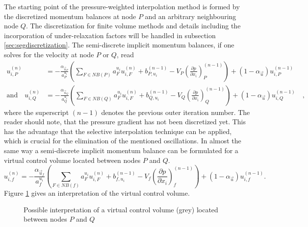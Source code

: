 The starting point of the pressure-weighted interpolation method is formed by the discretized momentum balances at node \(P\) and an arbitrary neighbouring node \(Q\). The discretization for finite volume methods and details including the incorporation of under-relaxation factors will be handled in subsection \ref{sec:segdiscretization}. The semi-discrete implicit momentum balances, if one solves for the velocity at node \(P\) or \(Q\), read
\begin{subequations}
\begin{align}
    u_{i,P}^{(n)} 
    &= 
    - \frac{\alpha_{\vec{u}_P}}{a_P^{u_i}} \left(\sum_{F \in NB(P)} a_F^{u_i} u_{i,F}^{(n)}
    +                                     b_{P,u_i}^{(n-1)} 
    -                                     V_P\left(\frac{\partial p}{\partial x_i}\right)_P^{(n-1)} \right)
    + \left(1 - \alpha_{\vec{u}}\right) u_{i,P}^{(n-1)}  \\[1em]
    \text{and} \quad
    u_{i,Q}^{(n)} 
    &= 
    - \frac{\alpha_{\vec{u}_Q}}{a_Q^{u_i}} \left(\sum_{F \in NB(Q)} a_F^{u_i} u_{i,F}^{(n)}
    +                                     b_{Q,u_i}^{(n-1)} 
    -                                     V_Q\left(\frac{\partial p}{\partial x_i}\right)_Q^{(n-1)}   \right)
    + \left(1 - \alpha_{\vec{u}}\right) u_{i,Q}^{(n-1)} \quad,
\end{align}
\end{subequations}
where the superscript \((n-1)\) denotes the previous outer iteration number. The reader should note, that the pressure gradient has not been discretized yet. This has the advantage that the selective interpolation technique \cite{schaefer99} can be applied, which is crucial for the elimination of the mentioned oscillations. In almost the same way a semi-discrete implicit momentum balance can be formulated for a virtual control volume located between nodes \(P\) and \(Q\). \begin{equation}
  \label{eq:virtualu}
  u_{i,f}^{(n)} 
  = 
  - \frac{\alpha_{\vec{u}_f}}{a_f^{u_i}} \left(\sum_{F \in NB(f)} a_F^{u_i} u_{i,F}^{(n)} 
  +                                     b_{f,u_i}^{(n-1)} 
  -                                     V_f\left(\frac{\partial p}{\partial x_i}\right)_f^{(n-1)}  \right)
  + \left(1 - \alpha_{\vec{u}}\right) u_{i,f}^{(n-1)}.
\end{equation}
Figure \ref{fig:virt} gives an interpretation of the virtual control volume.
\begin{figure}
\label{fig:virt}
  
  \centering{}
  \caption{Possible interpretation of a virtual control volume (grey) located between nodes $P$ and $Q$ }
\end{figure}
